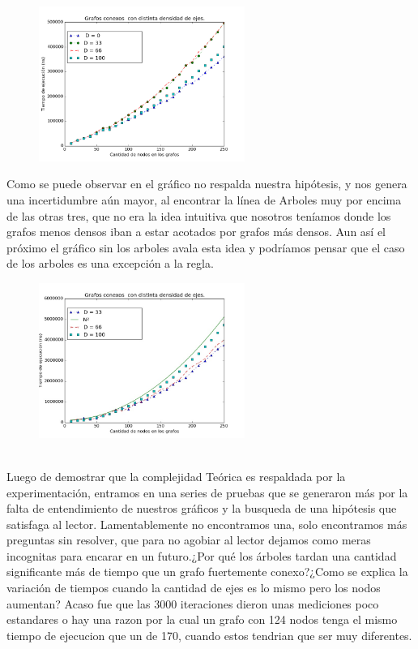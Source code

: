 \documentclass[spanish,12pt]{article}
\begin{document}
\begin{figure}[H]
\centering
\includegraphics[width=0.6\textwidth]{VariasDensidades}
\caption{}
\end{figure}

Como se puede observar en el gráfico no respalda nuestra hipótesis, y nos genera una incertidumbre aún mayor, al encontrar la línea de Arboles muy por encima de las otras tres, que no era la idea intuitiva que nosotros teníamos donde los grafos menos densos iban a estar acotados por grafos más densos. Aun así el próximo el gráfico sin los arboles avala esta idea y podríamos pensar que el caso de los arboles es una excepción a la regla.

\begin{figure}[H]
\centering
\includegraphics[width=0.6\textwidth]{VariasDensidadesSinArbol}
\caption{}
\end{figure}

\\
Luego de demostrar que la complejidad Teórica es respaldada por la experimentación, entramos en una series de pruebas que se generaron más por la falta de entendimiento de nuestros gráficos y la busqueda de una hipótesis que satisfaga al lector. Lamentablemente no encontramos una, solo encontramos más preguntas sin resolver, que para no agobiar al lector dejamos como meras incognitas para encarar en un futuro.¿Por qué los árboles tardan una cantidad significante más de tiempo que un grafo fuertemente conexo?¿Como se explica la variación de tiempos cuando la cantidad de ejes es lo mismo pero los nodos aumentan? Acaso fue que las 3000 iteraciones dieron unas mediciones poco estandares o hay una razon por la cual un grafo con 124 nodos tenga el mismo tiempo de ejecucion que un de 170, cuando estos tendrian que ser muy diferentes.  


\\

\\
\\
\end{document}
